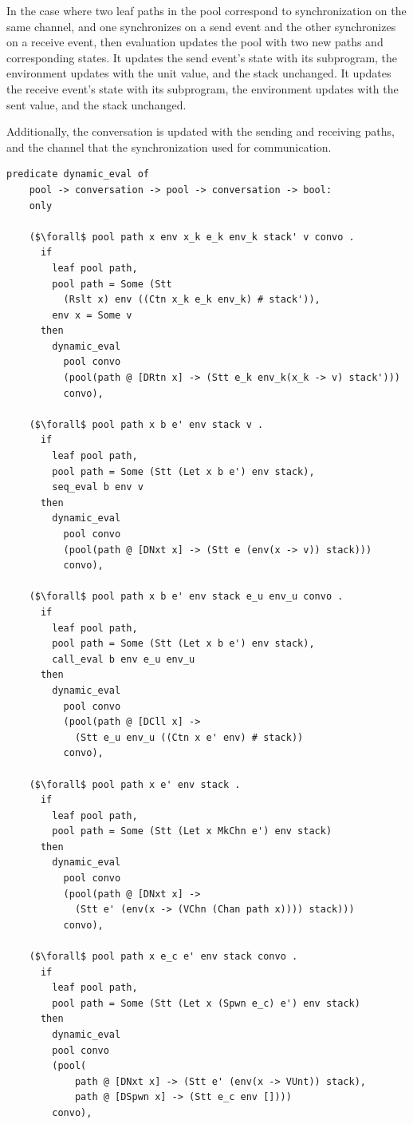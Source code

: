 \documentclass{article}
\begin{document}
In the case where two leaf paths in the pool correspond to synchronization on the same channel,
and one synchronizes on a send event and the other synchronizes on a receive event, then
evaluation updates the pool with two new paths and corresponding states.
It updates the send event's state with its subprogram, the environment updates with the unit
value, and the stack unchanged.  It updates the receive event's state with its subprogram, the
environment updates with the sent value, and the stack unchanged.

Additionally, the conversation is updated with the sending and receiving paths, and the channel
that the synchronization used for communication. 


\begin{lstlisting}[language=logic, mathescape]
  predicate dynamic_eval of
    pool -> conversation -> pool -> conversation -> bool: 
    only

    ($\forall$ pool path x env x_k e_k env_k stack' v convo .
      if
        leaf pool path,
        pool path = Some (Stt
          (Rslt x) env ((Ctn x_k e_k env_k) # stack')),
        env x = Some v
      then
        dynamic_eval
          pool convo
          (pool(path @ [DRtn x] -> (Stt e_k env_k(x_k -> v) stack')))
          convo),

    ($\forall$ pool path x b e' env stack v .
      if 
        leaf pool path,
        pool path = Some (Stt (Let x b e') env stack),
        seq_eval b env v
      then
        dynamic_eval
          pool convo
          (pool(path @ [DNxt x] -> (Stt e (env(x -> v)) stack)))
          convo),

    ($\forall$ pool path x b e' env stack e_u env_u convo .
      if 
        leaf pool path,
        pool path = Some (Stt (Let x b e') env stack),
        call_eval b env e_u env_u
      then
        dynamic_eval
          pool convo
          (pool(path @ [DCll x] ->
            (Stt e_u env_u ((Ctn x e' env) # stack))
          convo),

    ($\forall$ pool path x e' env stack .
      if 
        leaf pool path,
        pool path = Some (Stt (Let x MkChn e') env stack)
      then
        dynamic_eval
          pool convo 
          (pool(path @ [DNxt x] ->
            (Stt e' (env(x -> (VChn (Chan path x)))) stack)))
          convo),

    ($\forall$ pool path x e_c e' env stack convo .
      if 
        leaf pool path, 
        pool path = Some (Stt (Let x (Spwn e_c) e') env stack)
      then
        dynamic_eval
        pool convo 
        (pool(
            path @ [DNxt x] -> (Stt e' (env(x -> VUnt)) stack),
            path @ [DSpwn x] -> (Stt e_c env [])))
        convo),


\end{lstlisting}
\end{document}
